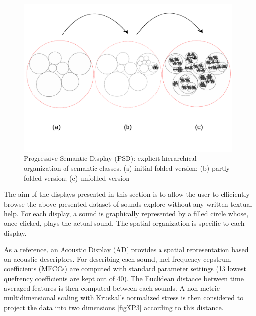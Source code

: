 \documentclass{aes2e}
\begin{document}
\begin{figure}[t]
\begin{center}
\includegraphics[scale=0.4]{gfx/XP1clean2.pdf} 
\end{center}
\caption{\label{figXP1} Progressive Semantic Display (PSD):  explicit hierarchical organization of semantic classes. (a) initial folded version; (b) partly folded version; (c) unfolded version}
\end{figure}



The aim of the displays presented in this section is to allow the user to efficiently browse the above presented dataset of sounds explore without any written textual help. For each display, a sound is graphically represented by a filled circle whose, once clicked, plays the actual sound. The spatial organization is specific to each display.

As a reference, an Acoustic Display (AD) provides a spatial representation based on acoustic descriptors. For describing each sound, mel-frequency cepstrum coefficients (MFCCs) are computed with standard parameter settings (13 lowest quefrency coefficients are kept out of 40). The Euclidean distance between time averaged features is then computed between each sounds. A non metric multidimensional scaling with Kruskal's normalized stress is then considered to project the data into two dimensions \ref{figXP3} according to this distance.
\end{document}
